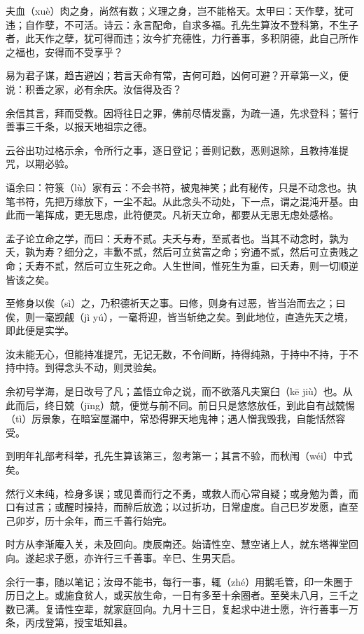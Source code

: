 \documentclass[12pt,UTF8]{ctexbook}
\begin{document}
夫血（xuè）肉之身，尚然有数；义理之身，岂不能格天。太甲曰：天作孽，犹可违；自作孽，不可活。诗云：永言配命，自求多福。孔先生算汝不登科第，不生子者，此天作之孽，犹可得而违；汝今扩充德性，力行善事，多积阴德，此自己所作之福也，安得而不受享乎？

易为君子谋，趋吉避凶；若言天命有常，吉何可趋，凶何可避？开章第一义，便说：积善之家，必有余庆。汝信得及否？

余信其言，拜而受教。因将往日之罪，佛前尽情发露，为疏一通，先求登科；誓行善事三千条，以报天地祖宗之德。

云谷出功过格示余，令所行之事，逐日登记；善则记数，恶则退除，且教持准提咒，以期必验。

语余曰：符箓（lù）家有云：不会书符，被鬼神笑；此有秘传，只是不动念也。执笔书符，先把万缘放下，一尘不起。从此念头不动处，下一点，谓之混沌开基。由此而一笔挥成，更无思虑，此符便灵。凡祈天立命，都要从无思无虑处感格。

孟子论立命之学，而曰：夭寿不贰。夫夭与寿，至贰者也。当其不动念时，孰为夭，孰为寿？细分之，丰歉不贰，然后可立贫富之命；穷通不贰，然后可立贵贱之命；夭寿不贰，然后可立生死之命。人生世间，惟死生为重，曰夭寿，则一切顺逆皆该之矣。

至修身以俟（sì）之，乃积德祈天之事。曰修，则身有过恶，皆当治而去之；曰俟，则一毫觊觎（jì yú），一毫将迎，皆当斩绝之矣。到此地位，直造先天之境，即此便是实学。

汝未能无心，但能持准提咒，无记无数，不令间断，持得纯熟，于持中不持，于不持中持。到得念头不动，则灵验矣。

余初号学海，是日改号了凡；盖悟立命之说，而不欲落凡夫窠臼（kē jiù）也。从此而后，终日兢（jīng）兢，便觉与前不同。前日只是悠悠放任，到此自有战兢惕（tì）厉景象，在暗室屋漏中，常恐得罪天地鬼神；遇人憎我毁我，自能恬然容受。

到明年礼部考科举，孔先生算该第三，忽考第一；其言不验，而秋闱（wéi）中式矣。

然行义未纯，检身多误；或见善而行之不勇，或救人而心常自疑；或身勉为善，而口有过言；或醒时操持，而醉后放逸；以过折功，日常虚度。自己巳岁发愿，直至己卯岁，历十余年，而三千善行始完。

时方从李渐庵入关，未及回向。庚辰南还。始请性空、慧空诸上人，就东塔禅堂回向。遂起求子愿，亦许行三千善事。辛巳、生男天启。

余行一事，随以笔记；汝母不能书，每行一事，辄（zhé）用鹅毛管，印一朱圈于历日之上。或施食贫人，或买放生命，一日有多至十余圈者。至癸未八月，三千之数已满。复请性空辈，就家庭回向。九月十三日，复起求中进士愿，许行善事一万条，丙戌登第，授宝坻知县。
\end{document}
